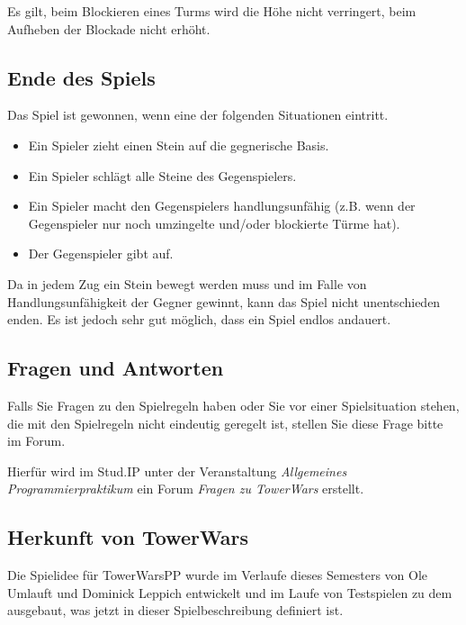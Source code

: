 Es gilt, beim Blockieren eines Turms wird die Höhe nicht verringert, beim Aufheben der Blockade nicht erhöht.



\subsection*{Ende des Spiels}
Das Spiel ist gewonnen, wenn eine der folgenden Situationen eintritt.
\begin{itemize}
\item Ein Spieler zieht einen Stein auf die gegnerische Basis.
\item Ein Spieler schlägt alle Steine des Gegenspielers.
\item Ein Spieler macht den Gegenspielers handlungsunfähig (z.B. wenn der Gegenspieler nur noch umzingelte und/oder blockierte Türme hat).
\item Der Gegenspieler gibt auf.
\end{itemize}

Da in jedem Zug ein Stein bewegt werden muss und im Falle von Handlungsunfähigkeit der Gegner gewinnt, kann das Spiel nicht unentschieden enden. Es ist jedoch sehr gut möglich, dass ein Spiel endlos andauert.

\subsection*{Fragen und Antworten}
Falls Sie Fragen zu den Spielregeln haben oder Sie vor einer Spielsituation stehen, die mit den Spielregeln nicht eindeutig geregelt ist, stellen Sie diese Frage bitte im Forum.

Hierfür wird im Stud.IP unter der Veranstaltung \textit{Allgemeines Programmierpraktikum} ein Forum \textit{Fragen zu TowerWars} erstellt.

\subsection*{Herkunft von TowerWars}
Die Spielidee für TowerWarsPP wurde im Verlaufe dieses Semesters von Ole Umlauft und Dominick Leppich entwickelt und im Laufe von Testspielen zu dem ausgebaut, was jetzt in dieser Spielbeschreibung definiert ist.

